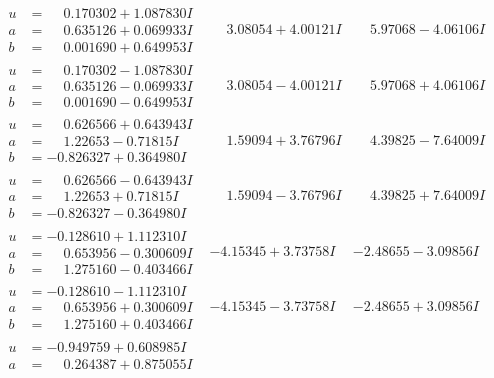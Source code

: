 \documentclass[1p]{elsarticle_modified}
\theoremstyle{definition}
\begin{document}
$$\begin{array}{c|c|c}
\begin{aligned}
u &= \phantom{-}0.170302 + 1.087830 I \\
a &= \phantom{-}0.635126 + 0.069933 I \\
b &= \phantom{-}0.001690 + 0.649953 I\end{aligned}
 & \phantom{-}3.08054 + 4.00121 I & \phantom{-}5.97068 - 4.06106 I \\ \hline\begin{aligned}
u &= \phantom{-}0.170302 - 1.087830 I \\
a &= \phantom{-}0.635126 - 0.069933 I \\
b &= \phantom{-}0.001690 - 0.649953 I\end{aligned}
 & \phantom{-}3.08054 - 4.00121 I & \phantom{-}5.97068 + 4.06106 I \\ \hline\begin{aligned}
u &= \phantom{-}0.626566 + 0.643943 I \\
a &= \phantom{-}1.22653 - 0.71815 I \\
b &= -0.826327 + 0.364980 I\end{aligned}
 & \phantom{-}1.59094 + 3.76796 I & \phantom{-}4.39825 - 7.64009 I \\ \hline\begin{aligned}
u &= \phantom{-}0.626566 - 0.643943 I \\
a &= \phantom{-}1.22653 + 0.71815 I \\
b &= -0.826327 - 0.364980 I\end{aligned}
 & \phantom{-}1.59094 - 3.76796 I & \phantom{-}4.39825 + 7.64009 I \\ \hline\begin{aligned}
u &= -0.128610 + 1.112310 I \\
a &= \phantom{-}0.653956 - 0.300609 I \\
b &= \phantom{-}1.275160 - 0.403466 I\end{aligned}
 & -4.15345 + 3.73758 I & -2.48655 - 3.09856 I \\ \hline\begin{aligned}
u &= -0.128610 - 1.112310 I \\
a &= \phantom{-}0.653956 + 0.300609 I \\
b &= \phantom{-}1.275160 + 0.403466 I\end{aligned}
 & -4.15345 - 3.73758 I & -2.48655 + 3.09856 I \\ \hline\begin{aligned}
u &= -0.949759 + 0.608985 I \\
a &= \phantom{-}0.264387 + 0.875055 I \\

\end{aligned}
\end{array}$$
\end{document}
